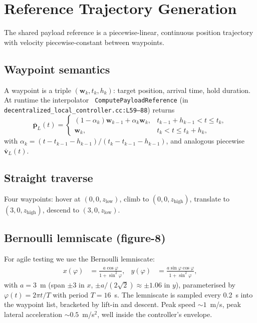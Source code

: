 \documentclass[11pt,a4paper,oneside]{report}
\newcommand{\bp}{\bm{p}}
\newcommand{\bv}{\bm{v}}
\begin{document}
\chapter{Reference Trajectory Generation}
\label{chap:trajectory}

The shared payload reference is a piecewise-linear, continuous
position trajectory with velocity piecewise-constant between
waypoints.

\section{Waypoint semantics}

A waypoint is a triple $(\bm{w}_k, t_k, h_k)$: target position, arrival
time, hold duration. At runtime the interpolator \texttt{
ComputePayloadReference} (in
\texttt{decentralized\_local\_controller.cc:L59--88}) returns
\begin{equation}
\bar{\bp}_L(t)=\begin{cases}
(1-\alpha_k)\bm{w}_{k-1}+\alpha_k\bm{w}_k,
&t_{k-1}+h_{k-1}< t \le t_k, \\
\bm{w}_k, & t_k< t\le t_k+h_k,
\end{cases}
\label{eq:traj-interp}
\end{equation}
with $\alpha_k = (t - t_{k-1} - h_{k-1}) / (t_k - t_{k-1} - h_{k-1})$,
and analogous piecewise $\bar{\bv}_L(t)$.

\section{Straight traverse}

Four waypoints: hover at $(\!0,0,z_\text{low})$, climb to
$(\!0,0,z_\text{high})$, translate to $(\!3,0,z_\text{high})$, descend
to $(\!3,0,z_\text{low})$.

\section{Bernoulli lemniscate (figure-8)}

For agile testing we use the Bernoulli lemniscate:
\begin{align}
x(\varphi) &= \frac{a\cos\varphi}{1+\sin^2\varphi}, &
y(\varphi) &= \frac{a\sin\varphi\cos\varphi}{1+\sin^2\varphi},
\label{eq:lemniscate}
\end{align}
with $a=3$~m (span $\pm 3$ in $x$, $\pm a/(2\sqrt{2})\approx\pm 1.06$
in $y$), parameterised by $\varphi(t)=2\pi t/T$ with period $T=16$~s.
The lemniscate is sampled every 0.2~s into the waypoint list,
bracketed by lift-in and descent. Peak speed $\sim 1$~m/s, peak
lateral acceleration $\sim 0.5$~m/s$^2$, well inside the controller's
envelope.
\end{document}
